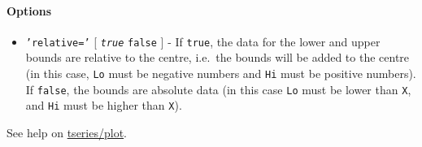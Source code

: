  \paragraph{Options}
 
 \begin{itemize}
 \item
   \texttt{'relative='} {[} \emph{\texttt{true}} \textbar{}
   \texttt{false} {]} - If \texttt{true}, the data for the lower and
   upper bounds are relative to the centre, i.e.~the bounds will be added
   to the centre (in this case, \texttt{Lo} must be negative numbers and
   \texttt{Hi} must be positive numbers). If \texttt{false}, the bounds
   are absolute data (in this case \texttt{Lo} must be lower than
   \texttt{X}, and \texttt{Hi} must be higher than \texttt{X}).
 \end{itemize}
 
 See help on \url{tseries/plot}.


